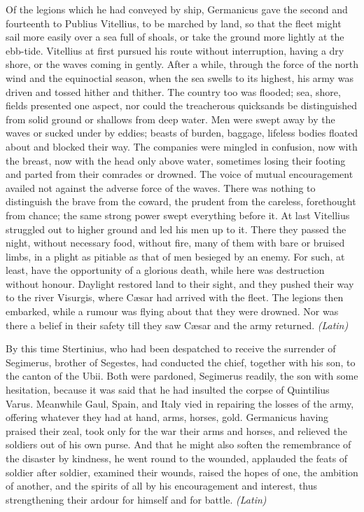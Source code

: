 
Of the legions which he had conveyed by ship, Germanicus gave the second and fourteenth to Publius Vitellius, to be marched by land, so that the fleet might sail more easily over a sea full of shoals, or take the ground more lightly at the ebb-tide. Vitellius at first pursued his route without interruption, having a dry shore, or the waves coming in gently. After a while, through the force of the north wind and the equinoctial season, when the sea swells to its highest, his army was driven and tossed hither and thither. The country too was flooded; sea, shore, fields presented one aspect, nor could the treacherous quicksands be distinguished from solid ground or shallows from deep water. Men were swept away by the waves or sucked under by eddies; beasts of burden, baggage, lifeless bodies floated about and blocked their way. The companies were mingled in confusion, now with the breast, now with the head only above water, sometimes losing their footing and parted from their comrades or drowned. The voice of mutual encouragement availed not against the adverse force of the waves. There was nothing to distinguish the brave from the coward, the prudent from the careless, forethought from chance; the same strong power swept everything before it. At last Vitellius struggled out to higher ground and led his men up to it. There they passed the night, without necessary food, without fire, many of them with bare or bruised limbs, in a plight as pitiable as that of men besieged by an enemy. For such, at least, have the opportunity of a glorious death, while here was destruction without honour. Daylight restored land to their sight, and they pushed their way to the river Visurgis, where Cæsar had arrived with the fleet. The legions then embarked, while a rumour was flying about that they were drowned. Nor was there a belief in their safety till they saw Cæsar and the army returned. \emph{(Latin)}


By this time Stertinius, who had been despatched to receive the surrender of Segimerus, brother of Segestes, had conducted the chief, together with his son, to the canton of the Ubii. Both were pardoned, Segimerus readily, the son with some hesitation, because it was said that he had insulted the corpse of Quintilius Varus. Meanwhile Gaul, Spain, and Italy vied in repairing the losses of the army, offering whatever they had at hand, arms, horses, gold. Germanicus having praised their zeal, took only for the war their arms and horses, and relieved the soldiers out of his own purse. And that he might also soften the remembrance of the disaster by kindness, he went round to the wounded, applauded the feats of soldier after soldier, examined their wounds, raised the hopes of one, the ambition of another, and the spirits of all by his encouragement and interest, thus strengthening their ardour for himself and for battle. \emph{(Latin)}

